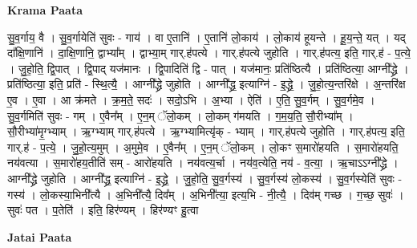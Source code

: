 \documentclass[17pt]{extarticle}
\begin{document}
\textbf{Krama Paata} \newline

सु॒व॒र्गाय॒ वै । सु॒व॒र्गायेति॑ सुवः - गाय॑ । वा ए॒तानि॑ । ए॒तानि॑ लो॒काय॑ । लो॒काय॑ हूयन्ते । हू॒य॒न्ते॒ यत् । यद् दा᳚क्षि॒णानि॑ । दा॒क्षि॒णानि॒ द्वाभ्या᳚म् । द्वाभ्या॒म् गार्.ह॑पत्ये । गार्.ह॑पत्ये जुहोति । गार्.ह॑पत्य॒ इति॒ गार्.ह॑ - प॒त्ये॒ । जु॒हो॒ति॒ द्वि॒पात् । द्वि॒पाद् यज॑मानः । द्वि॒पादिति॑ द्वि - पात् । यज॑मानः॒ प्रति॑ष्ठित्यै । प्रति॑ष्ठित्या॒ आग्नी᳚द्ध्रे । प्रति॑ष्ठित्या॒ इति॒ प्रति॑ - स्थि॒त्यै॒ । आग्नी᳚द्ध्रे जुहोति । आग्नी᳚द्ध्र॒ इत्याग्नि॑ - इ॒द्ध्रे॒ । जु॒हो॒त्य॒न्तरि॑क्षे । अ॒न्तरि॑क्ष ए॒व । ए॒वा । आ क्र॑मते । क्र॒म॒ते॒ सदः॑ । सदो॒ऽभि । अ॒भ्या । ऐति॑ । ए॒ति॒ सु॒व॒र्गम् । सु॒व॒र्गमे॒व । सु॒व॒र्गमिति॑ सुवः - गम् । ए॒वैन᳚म् । ए॒न॒म् ॅलो॒कम् । लो॒कम् ग॑मयति । ग॒म॒य॒ति॒ सौ॒रीभ्या᳚म् । सौ॒रीभ्या॑मृ॒ग्भ्याम् । ऋ॒ग्भ्याम् गार्.ह॑पत्ये । ऋ॒ग्भ्यामित्यृ॑क् - भ्याम् । गार्.ह॑पत्ये जुहोति । गार्.ह॑पत्य॒ इति॒ गार्.ह॑ - प॒त्ये॒ । जु॒हो॒त्य॒मुम् । अ॒मुमे॒व । ए॒वैन᳚म् । ए॒न॒म् ॅलो॒कम् । लो॒कꣳ स॒मारो॑हयति । स॒मारो॑हयति॒ नय॑वत्या । स॒मारो॑हय॒तीति॑ सम् - आरो॑हयति । नय॑वत्य॒र्चा । नय॑व॒त्येति॒ नय॑ - व॒त्या॒ । ऋ॒चाऽऽग्नी᳚द्ध्रे । आग्नी᳚द्ध्रे जुहोति । आग्नी᳚द्ध्र॒ इत्याग्नि॑ - इ॒द्ध्रे॒ । जु॒हो॒ति॒ सु॒व॒र्गस्य॑ । सु॒व॒र्गस्य॑ लो॒कस्य॑ । सु॒व॒र्गस्येति॑ सुवः - गस्य॑ । लो॒कस्या॒भिनी᳚त्यै । अ॒भिनी᳚त्यै॒ दिव᳚म् । अ॒भिनी᳚त्या॒ इत्य॒भि - नी॒त्यै॒ । दिव॑म् गच्छ । ग॒च्छ॒ सुवः॑ । सुवः॑ पत । प॒तेति॑ । इति॒ हिर॑ण्यम् । हिर॑ण्यꣳ हु॒त्वा \newline

\textbf{Jatai Paata} \newline
\end{document}
